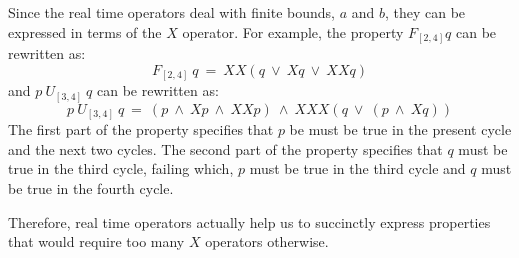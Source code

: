 \noindent
Since the real time operators deal with finite bounds, $a$ and $b$, they
can be expressed in terms of the $X$ operator. For example, the property
$F_{[2,4]} q$ can be rewritten as:
\[ F_{[2,4]}\ q\ =\ XX(q\ \lor\ Xq\ \lor\ XXq) \]
and $p\ U_{[3,4]}\ q$ can be rewritten as:
\[ p\ U_{[3,4]}\ q\ =\ (p\ \land\ Xp\ \land\  XXp)\ \land\ 
	XXX(q\ \lor\ (p\ \land\ Xq)) \]
The first part of the property specifies that $p$ be must be true in the
present cycle and the next two cycles. The second part of the property
specifies that $q$ must be true in the third cycle, failing which, $p$
must be true in the third cycle and $q$ must be true in the fourth cycle.

\noindent
Therefore, real time operators actually help us to succinctly express
properties that would require too many $X$ operators otherwise.
